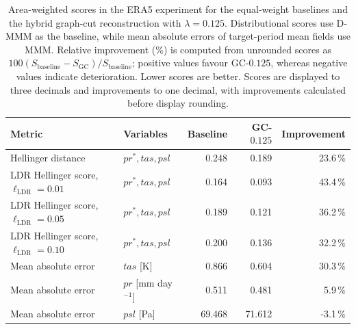 \begin{table}[t]
\centering
\caption{Area-weighted scores in the ERA5 experiment for the equal-weight baselines and the hybrid graph-cut reconstruction with \(\lambda=0.125\). Distributional scores use D-MMM as the baseline, while mean absolute errors of target-period mean fields use MMM. Relative improvement (\%) is computed from unrounded scores as \(100(S_{\mathrm{baseline}}-S_{\mathrm{GC}})/S_{\mathrm{baseline}}\); positive values favour GC-\(0.125\), whereas negative values indicate deterioration. Lower scores are better. Scores are displayed to three decimals and improvements to one decimal, with improvements calculated before display rounding.}
\label{tab:era5_global_scores}
\begin{tabular}{llrrr}
\hline
Metric & Variables & Baseline & GC-\(0.125\) & Improvement \\
\hline
Hellinger distance
& \(\mathit{pr}^{\ast},\mathit{tas},\mathit{psl}\)
& 0.248 & 0.189 & 23.6\,\% \\

LDR Hellinger score, \(\ell_{\mathrm{LDR}}=0.01\)
& \(\mathit{pr}^{\ast},\mathit{tas},\mathit{psl}\)
& 0.164 & 0.093 & 43.4\,\% \\

LDR Hellinger score, \(\ell_{\mathrm{LDR}}=0.05\)
& \(\mathit{pr}^{\ast},\mathit{tas},\mathit{psl}\)
& 0.189 & 0.121 & 36.2\,\% \\

LDR Hellinger score, \(\ell_{\mathrm{LDR}}=0.10\)
& \(\mathit{pr}^{\ast},\mathit{tas},\mathit{psl}\)
& 0.200 & 0.136 & 32.2\,\% \\

Mean absolute error
& \(\mathit{tas}\) [K]
& 0.866 & 0.604 & 30.3\,\% \\

Mean absolute error
& \(\mathit{pr}\) [mm day\(^{-1}\)]
& 0.511 & 0.481 & 5.9\,\% \\

Mean absolute error
& \(\mathit{psl}\) [Pa]
& 69.468 & 71.612 & -3.1\,\% \\
\hline
\end{tabular}
\end{table}
